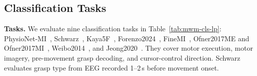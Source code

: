 \subsection{Classification Tasks}

\noindent\textbf{Tasks.}
We evaluate nine classification tasks in Table~\ref{tab:mwm-cls-lp}: PhysioNet-MI~\citep{schalk2009eegmmidb}, Schwarz~\citep{schwarz2020analyzing}, Kaya5F~\citep{kaya2018large}, Forenzo2024~\citep{forenzo2024continuous}, FineMI~\citep{yi2025multimodal}, Ofner2017ME and Ofner2017MI~\citep{ofner2017upper}, Weibo2014~\citep{yi2014evaluation}, and Jeong2020~\citep{jeong2020multimodal}. They cover motor execution, motor imagery, pre-movement grasp decoding, and cursor-control direction. Schwarz evaluates grasp type from EEG recorded 1--2\,s before movement onset.

